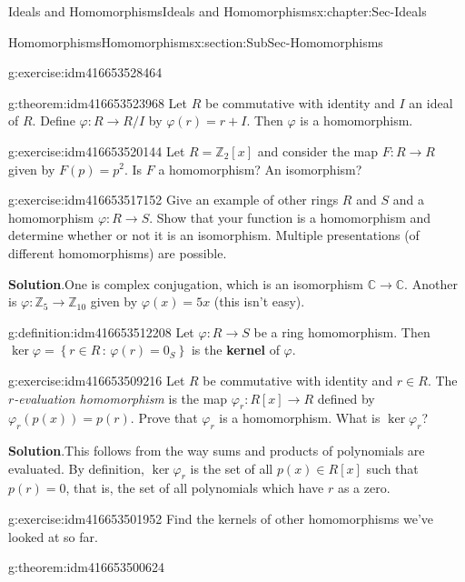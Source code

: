 \documentclass[oneside,10pt,]{book}
\newcommand{\terminology}[1]{\textbf{#1}}
\numberwithin{equation}{section}
\def\p{\varphi}
\newcommand{\setof}[2]{{\left\{#1\,\colon\,#2\right\}}}
\def\C{{\mathbb C}}
\def\Z{{\mathbb Z}}
\begin{document}
\begin{chapterptx}{Ideals and Homomorphisms}{}{Ideals and Homomorphisms}{}{}{x:chapter:Sec-Ideals}
\begin{sectionptx}{Homomorphisms}{}{Homomorphisms}{}{}{x:section:SubSec-Homomorphisms}
\begin{inlineexercise}{}{g:exercise:idm416653528464}
\end{inlineexercise}
\begin{theorem}{}{}{g:theorem:idm416653523968}%
Let \(R\) be commutative with identity and \(I\) an ideal of \(R\). Define \(\p: R\to R/I\) by \(\p(r) = r+I\). Then \(\p\) is a homomorphism.%
\end{theorem}
\begin{inlineexercise}{}{g:exercise:idm416653520144}%
Let \(R = \Z_2[x]\) and consider the map \(F: R \to R\) given by \(F(p) = p^2\). Is \(F\) a homomorphism? An isomorphism?%
\end{inlineexercise}
\begin{inlineexercise}{}{g:exercise:idm416653517152}%
Give an example of other rings \(R\) and \(S\) and a homomorphism \(\p : R\to S\). Show that your function is a homomorphism and determine whether or not it is an isomorphism. Multiple presentations (of different homomorphisms) are possible.%
\par\smallskip%
\noindent\textbf{Solution}.\hypertarget{g:solution:idm416653514544}{}\quad{}One is complex conjugation, which is an isomorphism \(\C\to\C\). Another is \(\p : \Z_5 \to \Z_{10}\) given by \(\p(x) = 5x\) (this isn't easy).%
\end{inlineexercise}
\begin{definition}{}{g:definition:idm416653512208}%
Let \(\p : R \to S\) be a ring homomorphism. Then \(\ker \p =\setof{r\in R}{\p(r)=0_S}\) is the \terminology{kernel} of \(\p\).%
\end{definition}
\begin{inlineexercise}{}{g:exercise:idm416653509216}%
Let \(R\) be commutative with identity and \(r\in R\). The \emph{\(r\)-evaluation homomorphism} is the map \(\p_r : R[x] \to R\) defined by \(\p_r(p(x)) = p(r)\). Prove that \(\p_r\) is a homomorphism. What is \(\ker \p_r\)?%
\par\smallskip%
\noindent\textbf{Solution}.\hypertarget{g:solution:idm416653504768}{}\quad{}This follows from the way sums and products of polynomials are evaluated. By definition, \(\ker \p_r\) is the set of all \(p(x)\in R[x]\) such that \(p(r) =0\), that is, the set of all polynomials which have \(r\) as a zero.%
\end{inlineexercise}
\begin{inlineexercise}{}{g:exercise:idm416653501952}%
Find the kernels of other homomorphisms we've looked at so far.%
\end{inlineexercise}
\begin{theorem}{}{}{g:theorem:idm416653500624}%

\end{theorem}
\end{sectionptx}
\end{chapterptx}
\end{document}
